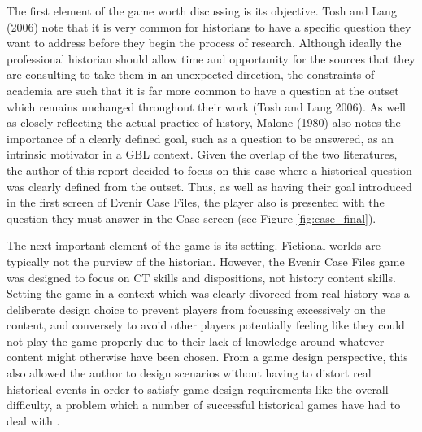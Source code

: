\documentclass{l4proj}
\begin{document}
The first element of the game worth discussing is its objective. Tosh and Lang (2006) note that it is very common for historians to have a specific question they want to address before they begin the process of research. Although ideally the professional historian should allow time and opportunity for the sources that they are consulting to take them in an unexpected direction, the constraints of academia are such that it is far more common to have a question at the outset which remains unchanged throughout their work (Tosh and Lang 2006). As well as closely reflecting the actual practice of history, Malone (1980) also notes the importance of a clearly defined goal, such as a question to be answered, as an intrinsic motivator in a GBL context. Given the overlap of the two literatures, the author of this report decided to focus on this case where a historical question was clearly defined from the outset. Thus, as well as having their goal introduced in the first screen of Evenir Case Files, the player also is presented with the question they must answer in the Case screen (see Figure \ref{fig:case_final}). 

The next important element of the game is its setting. Fictional worlds are typically not the purview of the historian. However, the Evenir Case Files game was designed to focus on CT skills and dispositions, not history content skills. Setting the game in a context which was clearly divorced from real history was a deliberate design choice to prevent players from focussing excessively on the content, and conversely to avoid other players potentially feeling like they could not play the game properly due to their lack of knowledge around whatever content might otherwise have been chosen. From a game design perspective, this also allowed the author to design scenarios without having to distort real historical events in order to satisfy game design requirements like the overall difficulty, a problem which a number of successful historical games have had to deal with \citep{mccall2016teaching}. 
\end{document}

